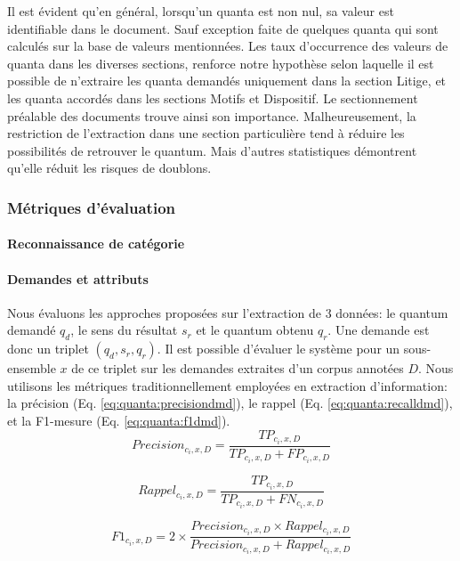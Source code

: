  Il est évident qu'en général, lorsqu'un quanta est non nul, sa valeur est identifiable dans le document. Sauf exception faite de quelques quanta qui sont calculés sur la base de valeurs mentionnées. Les taux d'occurrence des valeurs de quanta dans les diverses sections, renforce notre hypothèse selon laquelle il est possible de n'extraire les quanta demandés uniquement dans la section Litige, et les quanta accordés dans les sections Motifs et Dispositif. Le sectionnement préalable des documents trouve ainsi son importance. Malheureusement, la restriction de l'extraction dans une section particulière tend à réduire les possibilités de retrouver le quantum. Mais d'autres statistiques démontrent qu'elle réduit les risques de doublons.

\subsubsection{Métriques d'évaluation}
\paragraph{Reconnaissance de catégorie}

\paragraph{Demandes et attributs}
 Nous évaluons les approches proposées sur l'extraction de 3 données: le quantum demandé $q_d$, le sens du résultat $s_r$ et le quantum obtenu $q_r$. Une demande est donc un triplet $(q_d, s_r, q_r)$. Il est possible d'évaluer le système pour un sous-ensemble $x$ de ce triplet sur les demandes extraites d'un corpus annotées $D$. Nous utilisons les métriques traditionnellement employées en extraction d'information: la précision (Eq. \ref{eq:quanta:precisiondmd}), le rappel (Eq. \ref{eq:quanta:recalldmd}), et la F1-mesure (Eq. \ref{eq:quanta:f1dmd}). 
 \begin{equation}
 Precision_{c_i,x,D} = \frac{TP_{c_i,x,D}}{TP_{c_i,x,D} + FP_{c_i,x,D}}  \label{eq:quanta:precisiondmd}
\end{equation}

\begin{equation}
Rappel_{c_i,x,D} = \frac{TP_{c_i,x,D}}{TP_{c_i,x,D} + FN_{c_i,x,D}} \label{eq:quanta:recalldmd}
\end{equation}

\begin{equation}
F1_{c_i,x,D} =2 \times \frac{Precision_{c_i,x,D} \times Rappel_{c_i,x,D}}{Precision_{c_i,x,D} + Rappel_{c_i,x,D}} \label{eq:quanta:f1dmd}
\end{equation}

